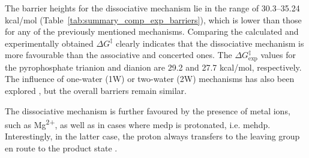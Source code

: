 The barrier heights for the dissociative mechanism lie in the range of 30.3--35.24 kcal/mol (Table~\ref{tab:summary_comp_exp_barriers}), which is lower than those for any of the previously mentioned mechanisms. Comparing the calculated and experimentally obtained $\Delta G^{\ddagger}$ clearly indicates that the dissociative mechanism is more favourable than the associative and concerted ones. The $\Delta G^{\ddagger}_{\text{exp}}$ values for the pyrophosphate trianion and dianion are 29.2 and 27.7 kcal/mol, respectively. The influence of one-water (1W) or two-water (2W) mechanisms has also been explored \citep{prasadAddressingOpenQuestions2013}, but the overall barriers remain similar.

The dissociative mechanism is further favoured by the presence of metal ions, such as Mg\textsuperscript{2+}, as well as in cases where \ac{medp} is protonated, i.e. \ac{mehdp}. Interestingly, in the latter case, the proton always transfers to the leaving group en route to the product state \citep{klahnMechanismHydrolysisPhosphate2006}.

